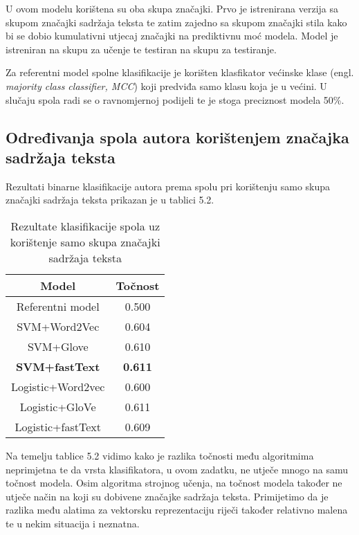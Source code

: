 \documentclass[times, utf8, zavrsni]{fer}
\begin{document}
U ovom modelu korištena su oba skupa značajki. Prvo je istrenirana verzija sa skupom značajki sadržaja teksta te zatim zajedno sa skupom značajki stila kako bi se dobio kumulativni utjecaj značajki na prediktivnu moć modela. Model je istreniran na skupu za učenje te testiran na skupu za testiranje. 

Za referentni model spolne klasifikacije je korišten klasfikator većinske klase (engl. \textit{majority class classifier, MCC}) koji predviđa samo klasu koja je u većini. U slučaju spola radi se o ravnomjernoj podijeli te je stoga preciznost modela 50\%.

\newpage

\subsection*{Određivanja spola autora korištenjem značajka sadržaja teksta}

Rezultati binarne klasifikacije autora prema spolu pri korištenju samo skupa značajki sadržaja teksta prikazan je u tablici 5.2.

\begin{table}[h!]
	\centering
	\begin{tabular}{||c|c||} 
		\hline
		Model & Točnost\\ [0.5ex] 
		\hline
		Referentni model & 0.500\\
		\hline
		SVM+Word2Vec & 0.604 \\
		\hline
		SVM+Glove & 0.610 \\
		\hline
		\textbf{SVM+fastText} & \textbf{0.611} \\
		\hline 
		Logistic+Word2vec & 0.600 \\ 
		\hline
		Logistic+GloVe & 0.611 \\ 
		\hline
		Logistic+fastText & 0.609 \\ 
		\hline
	\end{tabular}
	\caption{ Rezultate klasifikacije spola uz korištenje samo skupa značajki sadržaja teksta}
	\label{Table:1}
\end{table}


Na temelju tablice 5.2 vidimo kako je razlika točnosti među algoritmima neprimjetna te da vrsta klasifikatora, u ovom zadatku, ne utječe mnogo na samu točnost modela. Osim algoritma strojnog učenja, na točnost modela također ne utječe način na koji su dobivene značajke sadržaja teksta. Primijetimo da je razlika među alatima za vektorsku reprezentaciju riječi također relativno malena te u nekim situacija i neznatna.\newline
\end{document}
